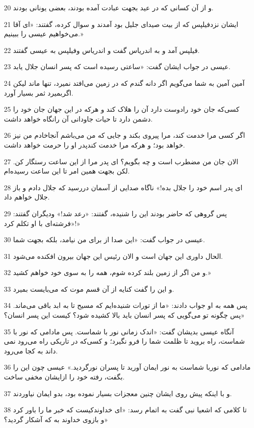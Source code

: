 \par 20 و از آن کسانی که در عید بجهت عبادت آمده بودند، بعضی یونانی بودند.
\par 21 ایشان نزدفیلپس که از بیت صیدای جلیل بود آمدند و سوال کرده، گفتند: «ای آقا می‌خواهیم عیسی را ببینیم.»
\par 22 فیلپس آمد و به اندریاس گفت و اندریاس وفیلپس به عیسی گفتند.
\par 23 عیسی در جواب ایشان گفت: «ساعتی رسیده است که پسر انسان جلال یابد.
\par 24 آمین آمین به شما می‌گویم اگر دانه گندم که در زمین می‌افتد نمیرد، تنها ماند لیکن اگربمیرد ثمر بسیار آورد.
\par 25 کسی‌که جان خود رادوست دارد آن را هلاک کند و هر‌که در این جهان جان خود را دشمن دارد تا حیات جاودانی آن رانگاه خواهد داشت.
\par 26 اگر کسی مرا خدمت کند، مرا پیروی بکند و جایی که من می‌باشم آنجاخادم من نیز خواهد بود؛ و هر‌که مرا خدمت کندپدر او را حرمت خواهد داشت.
\par 27 الان جان من مضطرب است و چه بگویم؟ ای پدر مرا از این ساعت رستگار کن. لکن بجهت همین امر تا این ساعت رسیده‌ام.
\par 28 ‌ای پدر اسم خود را جلال بده!» ناگاه صدایی از آسمان در‌رسید که جلال دادم و باز جلال خواهم داد.
\par 29 پس گروهی که حاضر بودند این را شنیده، گفتند: «رعد شد!» ودیگران گفتند: «فرشته‌ای با او تکلم کرد!»
\par 30 عیسی در جواب گفت: «این صدا از برای من نیامد، بلکه بجهت شما.
\par 31 الحال داوری این جهان است و الان رئیس این جهان بیرون افکنده می‌شود.
\par 32 و من اگر از زمین بلند کرده شوم، همه را به سوی خود خواهم کشید.»
\par 33 و این را گفت کنایه از آن قسم موت که می‌بایست بمیرد.
\par 34 پس همه به او جواب دادند: «ما از تورات شنیده‌ایم که مسیح تا به ابد باقی می‌ماند. پس چگونه تو می‌گویی که پسر انسان باید بالا کشیده شود؟ کیست این پسر انسان؟»
\par 35 آنگاه عیسی بدیشان گفت: «اندک زمانی نور با شماست. پس مادامی که نور با شماست، راه بروید تا ظلمت شما را فرو نگیرد؛ و کسی‌که در تاریکی راه می‌رود نمی داند به کجا می‌رود.
\par 36 مادامی که نوربا شماست به نور ایمان آورید تا پسران نورگردید.» عیسی چون این را بگفت، رفته خود را ازایشان مخفی ساخت.
\par 37 و با اینکه پیش روی ایشان چنین معجزات بسیار نموده بود، بدو ایمان نیاوردند.
\par 38 تا کلامی که اشعیا نبی گفت به اتمام رسد: «ای خداوندکیست که خبر ما را باور کرد و بازوی خداوند به که آشکار گردید؟»

